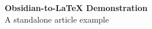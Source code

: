 \documentclass[a4paper,11pt,DIV=12,parskip=half]{scrartcl}
\begin{document}
\begin{center}
    {\Large\bfseries Obsidian-to-LaTeX Demonstration}\\[4pt]
    {\small A standalone article example}
\end{center}
\vspace{0.5em}

\printbibliography[title={References}]
\end{document}
